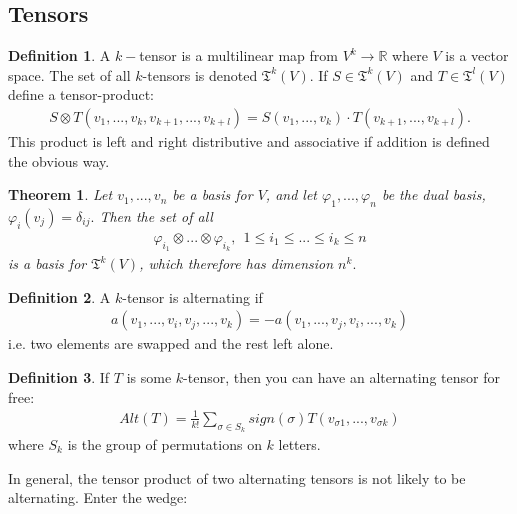 \documentclass[20pt]{article}
\theoremstyle{plain}
\newtheorem{theorem}{Theorem}
\theoremstyle{definition}
\newtheorem{definition}{Definition}
\newcommand{\reals}{\mathbb{R}}
\begin{document}
\subsection{Tensors}
\begin{definition}
  A $k-$tensor is a multilinear map from 
  $V^k \to \reals$ where $V$ is a vector space.
  The set of all $k$-tensors is denoted $\mathfrak{T}^k(V)$.
  If $S \in \mathfrak{T}^k(V)$ and $T \in \mathfrak{T}^l(V)$
  define a tensor-product:
  \begin{align*}
    S \otimes T (v_1, ..., v_k, v_{k+1}, ..., v_{k+l}) = 
    S(v_1, ..., v_k)\cdot T(v_{k+1}, ..., v_{k+l}).
  \end{align*}
  This product is left and right distributive and associative if addition is defined the obvious way.
\end{definition}

\begin{theorem}
  Let $v_1, ..., v_n$ be a basis for $V$, and let 
  $\varphi_1, ..., \varphi_n$ be the dual basis, $\varphi_i(v_j) = \delta_{ij}.$
  Then the set of all 
  \begin{align*}
    \varphi_{i_1} \otimes ... \otimes \varphi_{i_k}, \ \ 1 \leq i_1 \leq ... \leq i_k \leq n
  \end{align*}
  is a basis for $\mathfrak{T}^k(V)$, which therefore has dimension $n^k.$
\end{theorem}


\begin{definition}
  A $k$-tensor is alternating if
  \begin{align*}
    a(v_1, ..., v_i, v_j, ..., v_k) = -a(v_1, ..., v_j, v_i, ..., v_k)
  \end{align*}
  i.e. two elements are swapped and the rest left alone.
\end{definition}


\begin{definition}
  If $T$ is some $k$-tensor, 
  then you can have an alternating tensor for free:
  \begin{align*}
    Alt(T) = \frac{1}{k!}\sum_{\sigma \in S_k} sign(\sigma)
      T(v_{\sigma1}, ..., v_{\sigma k})
  \end{align*}
  where $S_k$ is the group of permutations on $k$ letters.
\end{definition}

In general, the tensor product of two alternating tensors is not likely to be alternating.  Enter the wedge:
\end{document}
